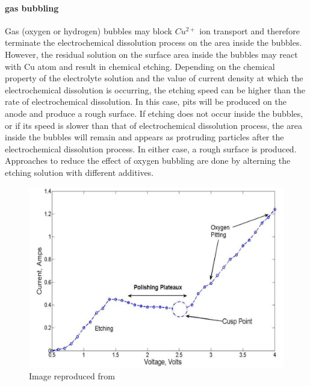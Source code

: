 \paragraph{gas bubbling}
Gas (oxygen or hydrogen) bubbles may block $Cu^{2+}$ ion transport and therefore terminate the electrochemical dissolution process on the area inside the bubbles. However, the residual solution on the surface area inside the bubbles may react with Cu atom and result in chemical etching. Depending on the chemical property of the electrolyte solution and the value of current density at which the electrochemical dissolution is occurring, the etching speed can be higher than the rate of electrochemical dissolution. In this case, pits will be produced on the anode and produce a rough surface. If etching does not occur inside the bubbles, or if its speed is slower than that of electrochemical dissolution process, the area inside the bubbles will remain and appears as protruding particles after the electrochemical dissolution process. In either case, a rough surface is produced. Approaches to reduce the effect of oxygen bubbling are done by alterning the etching solution with different additives.

\begin{figure}[!h]
\centering
  \includegraphics[width=\textwidth]{./images/oxygen-pitting}
\caption{Image reproduced from \cite[3]{stables_report_2008}}
\label{oxygen-pitting}
\end{figure}

